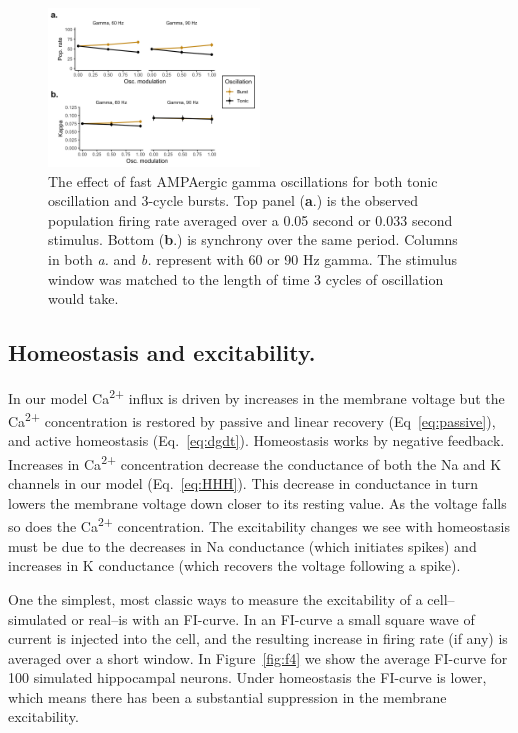 \documentclass{article}
\begin{document}
\begin{figure}
\centering
\includegraphics[width=0.5\textwidth]{fig3.png}
\caption{\label{fig:f3}
    The effect of fast AMPAergic gamma oscillations for both tonic oscillation and 3-cycle bursts. 
    Top panel (\textbf{a}.) is the observed population firing rate averaged over a 0.05 second or 0.033 second stimulus. Bottom (\textbf{b}.) is synchrony over the same period. Columns in both \textit{a.} and \textit{b.} represent with 60 or 90 Hz gamma. The stimulus window was matched to the length of time 3 cycles of oscillation would take.
}
\end{figure}

\subsection*{Homeostasis and excitability.}
In our model Ca\textsuperscript{2+} influx is driven by increases in the membrane voltage but the Ca\textsuperscript{2+} concentration is restored by passive and linear recovery (Eq~\ref{eq:passive}), and active homeostasis (Eq.~\ref{eq:dgdt}). Homeostasis works by negative feedback. Increases in Ca\textsuperscript{2+} concentration decrease the conductance of both the Na and K channels in our model (Eq.~\ref{eq:HHH}). This decrease in conductance in turn lowers the membrane voltage down closer to its resting value. As the voltage falls so does the Ca\textsuperscript{2+} concentration. The excitability changes we see with homeostasis must be due to the decreases in Na conductance (which initiates spikes) and increases in K conductance (which recovers the voltage following a spike).

One the simplest, most classic ways to measure the excitability of a cell--simulated or real--is with an FI-curve. In an FI-curve a small square wave of current is injected into the cell, and the resulting increase in firing rate (if any) is averaged over a short window. In Figure~\ref{fig:f4} we show the average FI-curve for 100 simulated hippocampal neurons. Under homeostasis the FI-curve is lower, which means there has been a substantial suppression in the membrane excitability.
\end{document}
